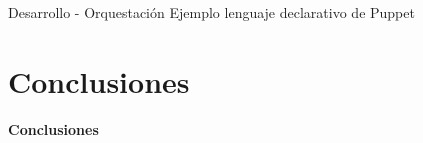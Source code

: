 \begin{frame}{Desarrollo - Orquestación}
    \vspace{0cm} {Ejemplo lenguaje declarativo de Puppet}
    \vspace{0cm}
    \begin{figure}[ht]
       \centering
    \end{figure}

\end{frame}
\section{Conclusiones}
\begin{frame}
    \Huge
    \centering
    \textbf{Conclusiones}

\end{frame}

